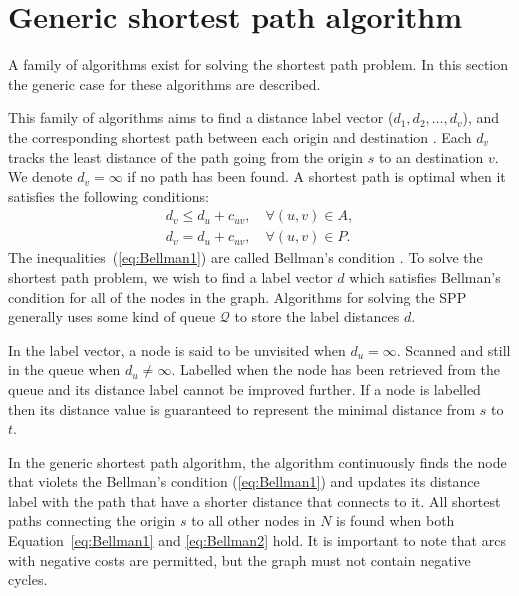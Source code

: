 \begin{comment}
Through out the report,
run-time analysis (big O and other notations) is used to demonstrate the estimation of algorithm running time regarding their input size. 
\todo[inline]{How do I nicely say `let the reader refer to other resources?'
or do I describe what big O notation is?}
\end{comment}

\section{Generic shortest path algorithm}
A family of algorithms exist for solving the shortest path problem.
In this section the generic case for these algorithms are described.

This family of algorithms aims to find a 
distance label vector ($d_1, d_2,\dots, d_v$),
and the corresponding shortest path between each origin and destination \citep{Klunder}.
Each $d_v$ tracks the least distance of the path going from the origin $s$ to an destination $v$.
We denote $d_v = \infty$ if no path has been found.
A shortest path is optimal when it satisfies the following conditions:
\begin{align}
    d_v \leq d_u + c_{uv}, \quad \forall(u,v) \in A, \label{eq:Bellman1}\\
    d_v  =   d_u + c_{uv}, \quad \forall(u,v) \in P. \label{eq:Bellman2}
\end{align}
The inequalities~(\ref{eq:Bellman1}) are called Bellman's condition \citep{Bellman}.
To solve the shortest path problem,
we wish to find a label vector $d$ which satisfies Bellman's condition for all of the nodes in the graph.
Algorithms for solving the SPP generally uses some kind of queue $\mathcal{Q}$ to store the label distances $d$.

In the label vector,
a node is said to be unvisited when $d_u = \infty$.
Scanned and still in the queue when $d_u \neq \infty$.
Labelled when the node has been retrieved from the queue and its distance label cannot be improved further.
If a node is labelled then its distance value is guaranteed to represent the minimal distance from $s$ to $t$.

In the generic shortest path algorithm,
the algorithm continuously finds the node that violets the Bellman's condition (\ref{eq:Bellman1}) and updates its distance label with the path that have a shorter distance that connects to it.
All shortest paths connecting the origin $s$ to all other nodes in $N$ is found when both Equation~\ref{eq:Bellman1} and \ref{eq:Bellman2} hold.
It is important to note that arcs with negative costs are permitted,
but the graph must not contain negative cycles.


